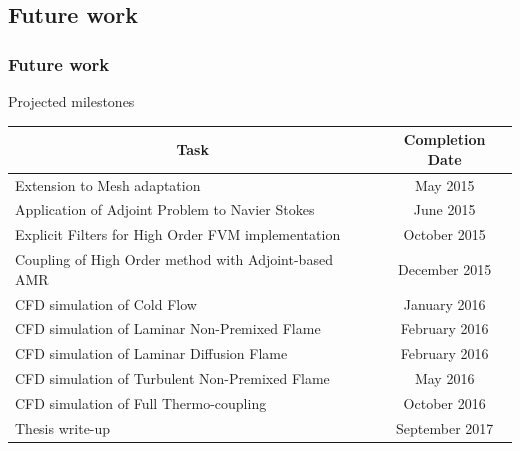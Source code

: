 \documentclass{beamer}
\begin{document}
\subsection[Future]{Future work}
\begin{frame}%
\frametitle{Future work}
\scriptsize


\begin{minipage}[t][1\textheight]{1\textwidth}
\vspace{-20pt}
\begin{exampleblock}{Projected milestones}

\begin{tabular}{|l|c|} \hline
\multicolumn{1}{|c|}{\bf{Task}} & \multicolumn{1}{|c|}{\bf{Completion Date}} \\

\hline Extension to Mesh adaptation & May 2015\\

\hline Application of Adjoint Problem to Navier Stokes  & June 2015\\

\hline Explicit Filters for High Order FVM implementation  & October 2015\\

\hline Coupling of High Order method with Adjoint-based AMR & December 2015\\

\hline CFD simulation of Cold Flow & January 2016\\

\hline CFD simulation of Laminar Non-Premixed Flame & February 2016\\

\hline CFD simulation of Laminar Diffusion Flame & February 2016\\

\hline CFD simulation of Turbulent Non-Premixed Flame & May 2016\\

\hline CFD simulation of Full Thermo-coupling & October 2016\\

\hline Thesis write-up & September 2017 \\ 

\hline

\end{tabular}

\end{exampleblock}
\end{minipage}

\end{frame}
\end{document}
